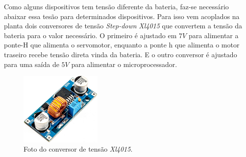 	   Como alguns dispositivos tem tensão diferente da bateria, faz-se necessário abaixar essa tesão para determinados dispositivos. Para isso vem acoplados na planta dois conversores de tensão \textit{Step-down} \textit{Xl4015} que convertem a tensão da bateria para o valor necessário. O primeiro é ajustado em $7V$ para alimentar a ponte-H que alimenta o servomotor, enquanto a ponte h que alimenta o motor traseiro recebe tensão direta vinda da bateria. E o outro conversor é ajustado para uma saída de $5V$ para alimentar o microprocessador.
	
    	\begin{figure}[h]
            \centering
            \includegraphics[width=4cm]{Imagens/cap2/xl.jpg}
            \caption{Foto do conversor de tensão \textit{Xl4015}.}
            \label{img:theta}
        \end{figure}
